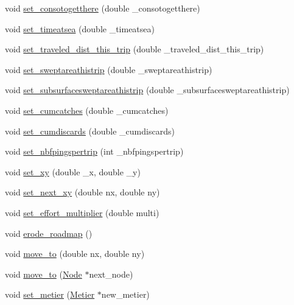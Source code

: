 \begin{DoxyCompactItemize}
void \mbox{\hyperlink{class_vessel_a159a8bbab0239bd61c339ff734c7f2fc}{set\+\_\+consotogetthere}} (double \+\_\+consotogetthere)
\item 
void \mbox{\hyperlink{class_vessel_ae920b371efe17e0f297a29c5a447ab8e}{set\+\_\+timeatsea}} (double \+\_\+timeatsea)
\item 
void \mbox{\hyperlink{class_vessel_ae9152e3a08b31d47d9beaf239be59075}{set\+\_\+traveled\+\_\+dist\+\_\+this\+\_\+trip}} (double \+\_\+traveled\+\_\+dist\+\_\+this\+\_\+trip)
\item 
void \mbox{\hyperlink{class_vessel_ab90ec6f26b539e8de42894017ccd4306}{set\+\_\+sweptareathistrip}} (double \+\_\+sweptareathistrip)
\item 
void \mbox{\hyperlink{class_vessel_ad9770eb30a9372def8da76adced814d1}{set\+\_\+subsurfacesweptareathistrip}} (double \+\_\+subsurfacesweptareathistrip)
\item 
void \mbox{\hyperlink{class_vessel_ac8a4da4161e36f9ca7e0e001a0c2f2dd}{set\+\_\+cumcatches}} (double \+\_\+cumcatches)
\item 
void \mbox{\hyperlink{class_vessel_ac9c63874aedbecbc15004e787a8eb9ad}{set\+\_\+cumdiscards}} (double \+\_\+cumdiscards)
\item 
void \mbox{\hyperlink{class_vessel_a93497f7d218b968b2c5eace1f8732a2c}{set\+\_\+nbfpingspertrip}} (int \+\_\+nbfpingspertrip)
\item 
void \mbox{\hyperlink{class_vessel_ab2d88cc297c1dfc33286462527e96130}{set\+\_\+xy}} (double \+\_\+x, double \+\_\+y)
\item 
void \mbox{\hyperlink{class_vessel_ac7f46469511134a11fd75865d15cfcf1}{set\+\_\+next\+\_\+xy}} (double nx, double ny)
\item 
void \mbox{\hyperlink{class_vessel_a0ffe3b52ff0000bcc8e6657a16217abb}{set\+\_\+effort\+\_\+multiplier}} (double multi)
\item 
void \mbox{\hyperlink{class_vessel_a256ecb4ddbbd21e1569669d15b7d0dc0}{erode\+\_\+roadmap}} ()
\item 
void \mbox{\hyperlink{class_vessel_a33faecffbd209fa2964c2bf5611e5d44}{move\+\_\+to}} (double nx, double ny)
\item 
void \mbox{\hyperlink{class_vessel_a08d0e35331d361922add3b27223a4313}{move\+\_\+to}} (\mbox{\hyperlink{class_node}{Node}} $\ast$next\+\_\+node)
\item 
void \mbox{\hyperlink{class_vessel_a364b8fd263a586fd5271188fda037b52}{set\+\_\+metier}} (\mbox{\hyperlink{class_metier}{Metier}} $\ast$new\+\_\+metier)
\item 

\end{DoxyCompactItemize}
